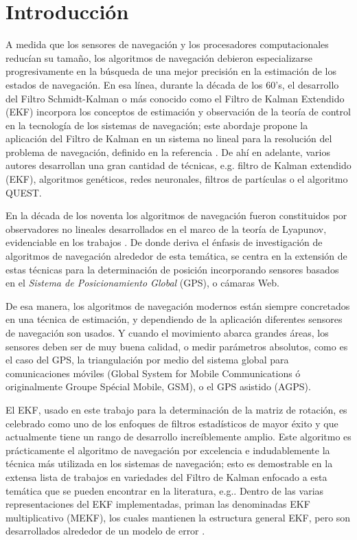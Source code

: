 \documentclass[conference]{IEEEtran}
\begin{document}
\section{Introducción}
A medida que los sensores de navegación y los procesadores computacionales reducían su tamaño, los algoritmos de navegación debieron especializarse progresivamente en la búsqueda de una mejor precisión en la estimación de los estados de navegación. En esa línea, durante la década de los 60's, el desarrollo del Filtro Schmidt-Kalman \cite{Schmidt1966} o más conocido como el Filtro de Kalman Extendido (EKF) incorpora los conceptos de estimación y observación de la teoría de control en la tecnología de los sistemas de navegación; este abordaje propone la aplicación del Filtro de Kalman \cite{Kalman1960} en un sistema no lineal para la resolución del problema de navegación, definido en la referencia \cite{Schmidt1962}. De ahí en adelante, varios autores desarrollan una gran cantidad de técnicas, e.g. filtro de Kalman extendido (EKF), algoritmos genéticos, redes neuronales, filtros de partículas o el algoritmo QUEST.\par
En la década de los noventa los algoritmos de navegación fueron constituidos por observadores no lineales desarrollados en el marco de la teoría de Lyapunov, %
evidenciable en los trabajos \cite{Lukyanov1996,Nicosia1996,Algrain1997}. De donde deriva el énfasis de investigación de algoritmos de navegación alrededor de esta temática, se centra en la extensión de estas técnicas para la determinación de posición incorporando sensores basados en el \emph{Sistema de Posicionamiento Global} (GPS), o cámaras Web.\par
De esa manera, los algoritmos de navegación modernos están siempre concretados en una técnica de estimación, y dependiendo de la aplicación diferentes sensores de navegación son usados. Y cuando el movimiento abarca grandes áreas, los sensores deben ser de muy buena calidad, o medir parámetros absolutos, como es el caso del GPS, la triangulación por medio del sistema global para comunicaciones móviles (Global System for Mobile Communications ó originalmente Groupe Spécial Mobile, GSM), o el GPS asistido (AGPS).\par
El EKF, usado en este trabajo para la determinación de la matriz de rotación, es celebrado como uno de los enfoques de filtros estadísticos de mayor éxito y que actualmente tiene un rango de desarrollo increíblemente amplio. Este algoritmo es prácticamente el algoritmo de navegación por excelencia e indudablemente la técnica más utilizada en los sistemas de navegación; esto es demostrable en la extensa lista de trabajos en variedades del Filtro de Kalman enfocado a esta temática que se pueden encontrar en la literatura, e.g.\cite{Faruki2000, Marins2001, Gandhi2007, Sabatini2006, Bistrovs2012}. Dentro de las varias representaciones del EKF implementadas, priman las denominadas EKF multiplicativo (MEKF), los cuales mantienen la estructura general EKF, pero son desarrollados alrededor de un modelo de error \cite{Friedland1978,Benson1975}.\par
\end{document}

